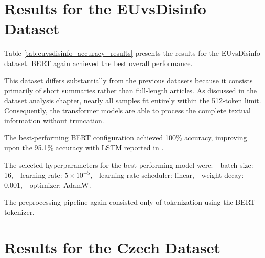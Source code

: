 \section{Results for the EUvsDisinfo Dataset}

\begin{markdown}

Table \ref{tab:euvsdisinfo_accuracy_results} presents the results for the EUvsDisinfo dataset. BERT again achieved the best overall performance.

This dataset differs substantially from the previous datasets because it consists primarily of short summaries rather than full-length articles. As discussed in the dataset analysis chapter, nearly all samples fit entirely within the 512-token limit. Consequently, the transformer models are able to process the complete textual information without truncation.

The best-performing BERT configuration achieved 100\% accuracy, improving upon the 95.1\% accuracy with LSTM reported in \cite{flajzik_classification_2024}.

\end{markdown}

\begin{table}[b]
    \small
    \centering
    \caption{Best results for the EUvsDisinfo dataset ranked by accuracy}
    \label{tab:euvsdisinfo_accuracy_results}
    
\end{table}

\FloatBarrier

\begin{markdown}

The selected hyperparameters for the best-performing model were:
- batch size: 16,
- learning rate: $5 \times 10^{-5}$,
- learning rate scheduler: linear,
- weight decay: 0.001,
- optimizer: AdamW.

The preprocessing pipeline again consisted only of tokenization using the BERT tokenizer.

\end{markdown}

\section{Results for the Czech Dataset}


